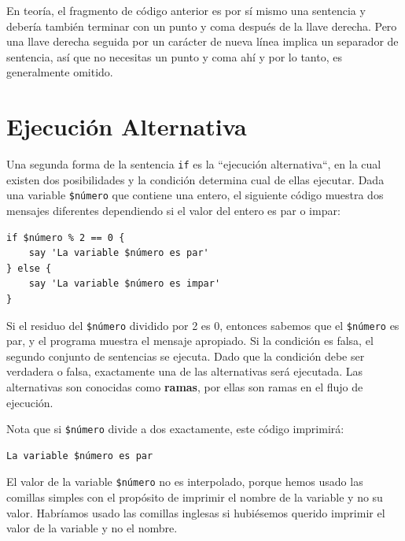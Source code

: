 En teoría, el fragmento de código anterior es por sí mismo una
sentencia y debería también terminar con un punto y coma después
de la llave derecha. Pero una llave derecha seguida por un carácter
de nueva línea implica un separador de sentencia, así que no 
necesitas un punto y coma ahí y por lo tanto, es generalmente
omitido.



\section{Ejecución Alternativa}
\label{alternative.execution}

Una segunda forma de la sentencia {\tt if} es la
``ejecución alternativa``, en la cual existen dos 
posibilidades y la condición determina cual de ellas
ejecutar. Dada una variable \verb|$número| que 
contiene una entero, el siguiente código muestra dos
mensajes diferentes dependiendo si el valor del
entero es par o impar:

\begin{lstlisting}
if $número % 2 == 0 {
    say 'La variable $número es par'
} else {
    say 'La variable $número es impar'
}
\end{lstlisting}
%
Si el residuo del {\tt \$número} dividido por 2 es 0,
entonces sabemos que el {\tt \$número} es par, y el programa
muestra el mensaje apropiado. Si la condición es falsa,
el segundo conjunto de sentencias se ejecuta. Dado que la
condición debe ser verdadera o falsa, exactamente una de las
alternativas será ejecutada. Las alternativas son conocidas
como {\bf ramas}, por ellas son ramas en el flujo de ejecución.

Nota que si \verb|$número| divide a dos exactamente, este
código imprimirá:

\begin{lstlisting} 
La variable $número es par
\end{lstlisting}

El valor de la  variable \verb|$número| no es interpolado,
porque hemos usado las comillas simples con el propósito
de imprimir el nombre de la variable y no su valor. Habríamos
usado las comillas inglesas si hubiésemos querido imprimir
el valor de la variable y no el nombre.


